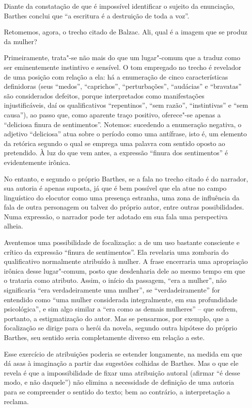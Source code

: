 Diante da constatação de que é impossível identificar o sujeito da
enunciação, Barthes conclui que ``a escritura é a destruição de toda a
voz''.

Retomemos, agora, o trecho citado de Balzac. Ali, qual é a imagem que se
produz da mulher?

Primeiramente, trata"-se não mais do que um lugar"-comum que a traduz como
ser eminentemente instintivo e sensível. O tom empregado no trecho é
revelador de uma posição com relação a ela: há a enumeração de cinco
características definidoras (seus ``medos'', ``caprichos'',
``perturbações'', ``audácias'' e ``bravatas'' são considerados defeitos,
porque interpretados como manifestações injustificáveis, daí os
qualificativos ``repentinos'', ``sem razão'', ``instintivas'' e ``sem
causa''), ao passo que, como aparente traço positivo, oferece"-se apenas
a ``deliciosa finura de sentimentos''. Notemos: sucedendo a enumeração
negativa, o adjetivo ``deliciosa'' atua sobre o período como uma
antífrase, isto é, um elemento da retórica segundo o qual se emprega uma
palavra com sentido oposto ao pretendido. À luz do que vem antes, a
expressão ``finura dos sentimentos'' é evidentemente irônica.

No entanto, e segundo o próprio Barthes, se a fala no trecho citado é do
narrador, sua autoria é apenas suposta, já que é bem possível que ela
atue no campo linguístico do elocutor como uma presença estranha, uma
zona de influência da fala de outra personagem ou talvez do próprio
autor, entre outras possibilidades. Numa expressão, o narrador pode ter
adotado em sua fala uma perspectiva alheia.

Aventemos uma possibilidade de focalização: a de um uso bastante
consciente e crítico da expressão ``finura de sentimentos''. Ela
revelaria uma zombaria do qualificativo normalmente atribuído à mulher.
A frase encerraria uma apropriação irônica desse lugar"-comum, posto que
desdenharia dele ao mesmo tempo em que o trataria como atributo. Assim,
o início da passagem, ``era a mulher'', não significaria ``era
verdadeiramente uma mulher'', se ``verdadeiramente'' for entendido como
``uma mulher considerada integralmente, em sua profundidade
psicológica'', e sim algo similar a ``era como as demais mulheres'' --
que sofrem, portanto, a estigmatização do autor. Mas se pensarmos, por
exemplo, que a focalização se dirige para o herói da novela, segundo
outra hipótese do próprio Barthes, seu sentido seria completamente
diverso em relação a este.

Esse exercício de atribuições poderia se estender longamente, na medida
em que dá asas à imaginação a partir das sugestões colhidas de Barthes.
Mas o que ele revela é que a impossibilidade de fixar uma atribuição
autoral (afirmar ``é desse modo, e não daquele'') não elimina a
necessidade de definição de uma autoria para se compreender o sentido do
texto; bem ao contrário, a interpretação a reclama.

